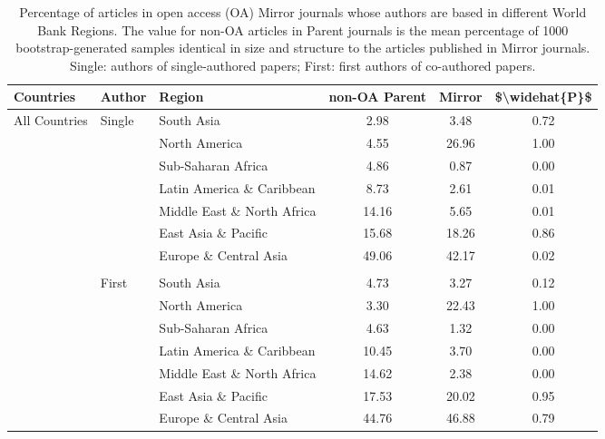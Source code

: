 \documentclass[
  english,
  man]{apa6}
\begin{document}
\begin{table}

\caption{\label{tab:Table4}Percentage of articles in open access (OA) Mirror journals whose authors are based in different World Bank Regions. The value for non-OA articles in Parent journals is the mean percentage of 1000 bootstrap-generated samples identical in size and structure to the articles published in Mirror journals. Single: authors of single-authored papers; First: first authors of co-authored papers.}
\centering
\fontsize{12}{14}\selectfont
\begin{tabular}[t]{lllccc}
\toprule
Countries & Author & Region & non-OA Parent & Mirror & \$\textbackslash{}widehat\{P\}\$\\
\midrule
All Countries & Single & South Asia & 2.98 & 3.48 & 0.72\\
 &  & North America & 4.55 & 26.96 & 1.00\\
 &  & Sub-Saharan Africa & 4.86 & 0.87 & 0.00\\
 &  & Latin America \& Caribbean & 8.73 & 2.61 & 0.01\\
 &  & Middle East \& North Africa & 14.16 & 5.65 & 0.01\\
 &  & East Asia \& Pacific & 15.68 & 18.26 & 0.86\\
 &  & Europe \& Central Asia & 49.06 & 42.17 & 0.02\\
 &  &  &  &  & \\
 & First & South Asia & 4.73 & 3.27 & 0.12\\
 &  & North America & 3.30 & 22.43 & 1.00\\
 &  & Sub-Saharan Africa & 4.63 & 1.32 & 0.00\\
 &  & Latin America \& Caribbean & 10.45 & 3.70 & 0.00\\
 &  & Middle East \& North Africa & 14.62 & 2.38 & 0.00\\
 &  & East Asia \& Pacific & 17.53 & 20.02 & 0.95\\
 &  & Europe \& Central Asia & 44.76 & 46.88 & 0.79\\
\bottomrule
\end{tabular}
\end{table}
\end{document}

